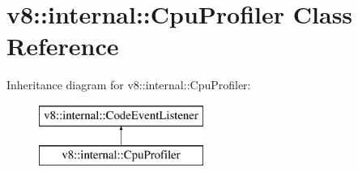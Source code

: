\hypertarget{classv8_1_1internal_1_1_cpu_profiler}{}\section{v8\+:\+:internal\+:\+:Cpu\+Profiler Class Reference}
\label{classv8_1_1internal_1_1_cpu_profiler}
Inheritance diagram for v8\+:\+:internal\+:\+:Cpu\+Profiler\+:\begin{figure}[H]
\begin{center}
\leavevmode
\includegraphics[height=2.000000cm]{classv8_1_1internal_1_1_cpu_profiler}
\end{center}
\end{figure}
